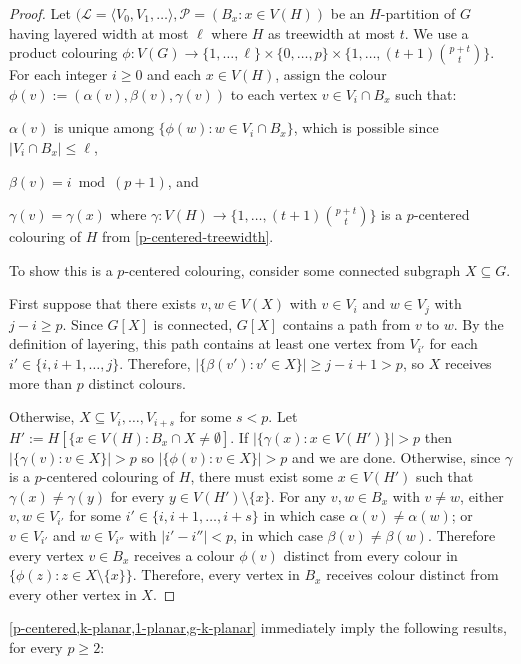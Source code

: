 \documentclass{patmorin}
\renewcommand{\ge}{\geqslant}
\renewcommand{\le}{\leqslant}
\begin{document}
\begin{proof}
  Let $(\mathcal{L}=\langle V_0,V_1,\ldots\rangle, \mathcal{P}=(B_x:x\in V(H))$ be an $H$-partition of $G$ having layered width at most $\ell$ where $H$ as treewidth at most $t$.
  We use a product colouring $\phi:V(G)\to \{1,\ldots,\ell\}\times\{0,\ldots,p\}\times\{1,\ldots,
  (t+1)\binom{p+t}{t}\}$.  For each integer $i\ge 0$ and each $x\in V(H)$, assign the colour $\phi(v):=(\alpha(v),\beta(v),\gamma(v))$ to each vertex $v\in V_i\cap B_x$ such that:
  \begin{compactenum}
    \item $\alpha(v)$ is unique among $\{\phi(w): w\in V_i\cap B_x\}$, which is possible 
    since $|V_i\cap B_x|\le \ell$,
    \item $\beta(v)= i\bmod (p+1)$, and     
    \item $\gamma(v)=\gamma(x)$ where $\gamma:V(H)\to\{1,\ldots,(t+1)\binom{p+t}{t}\}$ is a $p$-centered colouring of $H$ from \cref{p-centered-treewidth}.
  \end{compactenum}
To show this is a $p$-centered colouring, consider some connected subgraph $X\subseteq G$.
  
First suppose that there exists $v,w\in V(X)$ with $v\in V_i$ and $w\in V_j$ with $j-i\ge p$. Since $G[X]$ is connected, $G[X]$ contains a path from $v$ to $w$.  By the definition of layering, this path contains at least one vertex from $V_{i'}$ for each $i'\in\{i,i+1,\ldots,j\}$. Therefore, $|\{\beta(v'):v'\in X\}|\ge j-i+1 > p$, so $X$ receives more than $p$ distinct colours.
    
Otherwise, $X\subseteq V_{i},\ldots,V_{i+s}$ for some $s<p$.  Let $H':=H[\{x\in V(H):B_x\cap X\neq\emptyset]$.  If $|\{\gamma(x):x\in V(H')\}| > p$ then $|\{\gamma(v):v\in X\}|> p$ so $|\{\phi(v):v\in X\}|> p$ and we are done.  Otherwise, since $\gamma$ is a $p$-centered colouring of $H$, there must exist some $x\in V(H')$ such that $\gamma(x)\neq\gamma(y)$ for every $y\in V(H')\setminus\{x\}$.
    For any $v,w\in B_x$ with $v\neq w$, either $v,w\in V_{i'}$ for some $i'\in\{i,i+1,\ldots,i+s\}$ in which case $\alpha(v)\neq\alpha(w)$; or $v\in V_{i'}$ and $w\in V_{i''}$ with $|i'-i''|< p$, in which case $\beta(v)\neq\beta(w)$. Therefore every vertex $v\in B_x$ receives a colour $\phi(v)$ distinct from every colour in $\{\phi(z):z\in X\setminus\{x\}\}$. Therefore, every vertex in $B_x$ receives colour distinct from every other vertex in $X$.\end{proof}

\cref{p-centered,k-planar,1-planar,g-k-planar} immediately imply the following results, for every $p\ge 2$:
\end{document}
